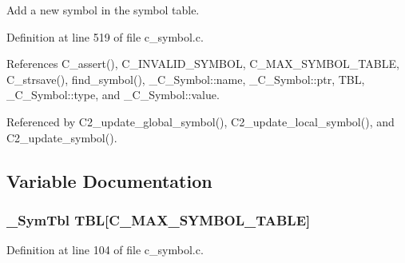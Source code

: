 Add a new symbol in the symbol table. 

Definition at line 519 of file c\_\-symbol.c.

References C\_\-assert(), C\_\-INVALID\_\-SYMBOL, C\_\-MAX\_\-SYMBOL\_\-TABLE, C\_\-strsave(), find\_\-symbol(), \_\-C\_\-Symbol::name, \_\-C\_\-Symbol::ptr, TBL, \_\-C\_\-Symbol::type, and \_\-C\_\-Symbol::value.

Referenced by C2\_\-update\_\-global\_\-symbol(), C2\_\-update\_\-local\_\-symbol(), and C2\_\-update\_\-symbol().

\subsection{Variable Documentation}
\subsubsection{\setlength{\rightskip}{0pt plus 5cm}\bf{\_\-Sym\-Tbl} \bf{TBL}[C\_\-MAX\_\-SYMBOL\_\-TABLE]}\label{c__symbol_8h_46b7c6724daa2c733e85cd7a6fde560a}




Definition at line 104 of file c\_\-symbol.c.